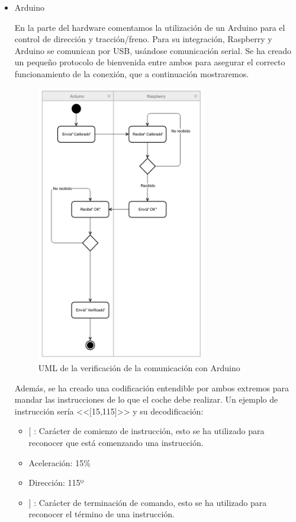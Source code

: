 \documentclass{pclass}
\begin{document}
\begin{itemize}
\begin{itemize}
\begin{itemize}
		\end{itemize}
	\medskip
	\item Arduino
	
	En la parte del hardware comentamos la utilización de un Arduino para el control de dirección y tracción/freno. Para su integración, Raspberry y Arduino se comunican por USB, usándose comunicación serial. Se ha creado un pequeño protocolo de bienvenida entre ambos para asegurar el correcto funcionamiento de la conexión, que a continuación mostraremos.
	
	\begin{figure}[H]
		\centering
		\includegraphics[width=0.7\textwidth]{img/umlComunicacion}
		\caption{UML de la verificación de la comunicación con Arduino}
		\label{fig:arduinoVerificacion}
	\end{figure}
	
	Además, se ha creado una codificación entendible por ambos extremos para mandar las instrucciones de lo que el coche debe realizar. Un ejemplo de instrucción sería <<$[$15,115$]$>> y su decodificación:
	\begin{itemize}
		\item $[$ : Carácter de comienzo de instrucción, esto se ha utilizado para reconocer que está comenzando una instrucción.
		\item Aceleración: 15\% 
		\item Dirección: 115º
		\item $]$ : Carácter de terminación de comando, esto se ha utilizado para reconocer el término de una instrucción.
	\end{itemize}
	

\end{itemize}
\end{itemize}
\end{document}

